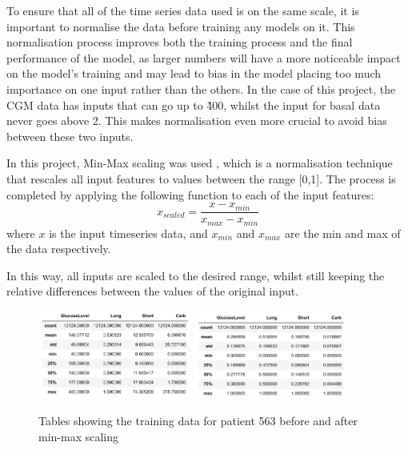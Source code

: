             To ensure that all of the time series data used is on the same scale, it is important to normalise the data before training any models on it. This normalisation process improves both the training process and the final performance of the model, as larger numbers will have a more noticeable impact on the model's training and may lead to bias in the model placing too much importance on one input rather than the others. In the case of this project, the CGM data has inputs that can go up to \~400, whilst the input for basal data never goes above 2. This makes normalisation even more crucial to avoid bias between these two inputs.

            In this project, Min-Max scaling was used \cite{minmax}, which is a normalisation technique that rescales all input features to values between the range [0,1]. The process is completed by applying the following function to each of the input features:
            \[x_{scaled} = \frac{x - x_{min}}{x_{max} - x_{min}}\]
            where $x$ is the input timeseries data, and $x_{min}$ and $x_{max}$ are the min and max of the data respectively.

            In this way, all inputs are scaled to the desired range, whilst still keeping the relative differences between the values of the original input.

            \begin{figure}[H]
              \centering
  
              \includegraphics[width=0.45\textwidth]{images/UnNormed.png}
              \includegraphics[width=0.45\textwidth]{images/Normed.png}  
              \caption{
               Tables showing the training data for patient 563 before and after min-max scaling
              }
            \end{figure}

